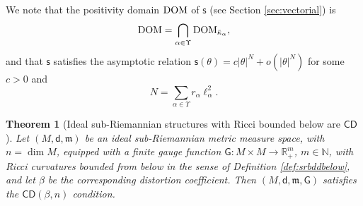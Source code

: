 \documentclass[11pt,a4paper]{article}
\theoremstyle{plain}
\newtheorem{theorem}{Theorem}[section]
\theoremstyle{definition}
\theoremstyle{remark}
\numberwithin{equation}{section}
\newcommand{\R}{\mathbb{R}} %
\newcommand{\N}{\mathbb{N}} %
\newcommand{\DOM}{{\rm{DOM}}}
\newcommand{\CD}{\mathsf{CD}}
\newcommand{\sfs}{\mathsf{s}}
\newcommand{\mm}{\mathfrak m}
\newcommand{\sfd}{\mathsf d}
\newcommand{\sfG}{\mathsf G}
\begin{document}
We note that the positivity domain $\DOM$ of $\sfs$ (see Section \ref{sec:vectorial}) is
\begin{equation}
\DOM = \bigcap_{\alpha\in\Upsilon} \DOM_{\bar{\kappa}_\alpha},
\end{equation}
and that $\sfs$ satisfies the asymptotic relation $\sfs(\theta) = c |\theta|^{N} + o(|\theta|^N)$ for some $c>0$ and
\begin{equation}
N=\sum_{\alpha\in \Upsilon} r_{\alpha} \ell_{\alpha}^2.
\end{equation}


\begin{theorem}[Ideal sub-Riemannian structures with Ricci bounded below are $\CD$]\label{thm:RiccbddbelowareCD}
Let $(M,\sfd,\mm)$ be an ideal sub-Riemannian metric measure space, with $n=\dim M$, equipped with a finite gauge function $\sfG : M \times M \to \R^m_+$, $m\in \N$, with Ricci curvatures bounded from below in the sense of Definition \ref{def:srbddbelow}, and let $\beta$ be the corresponding distortion coefficient. Then $(M,\sfd,\mm,\sfG)$ satisfies the $\CD(\beta,n)$ condition.
\end{theorem}
\end{document}
